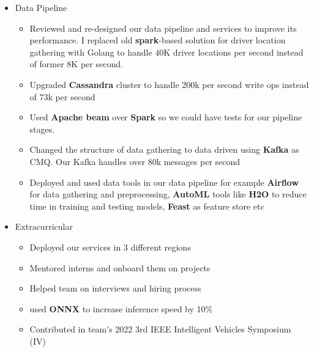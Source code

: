 \begin{itemize}
      \item Data Pipeline
            \begin{itemize}
                  \item Reviewed and re-designed our data pipeline and services to improve its performance.
                        I replaced old \textbf{spark}-based solution for driver location gathering with Golang to handle 40K driver
                        locations per second instead of former 8K per second.
                  \item Upgraded \textbf{Cassandra} cluster to handle 200k per second write ops instead of 73k per second
                  \item Used \textbf{Apache beam} over \textbf{Spark} so we could have tests for our pipeline stages.
                  \item Changed the structure of data gathering to data driven using \textbf{Kafka} as CMQ. Our Kafka handles over 80k messages per second
                  \item Deployed and used data tools in our data pipeline for example \textbf{Airflow} for data gathering and preprocessing, \textbf{AutoML} tools like \textbf{H2O} to reduce time in training and testing models, \textbf{Feast} as feature store etc
            \end{itemize}
      \item Extracurricular
            \begin{itemize}
                  \item Deployed our services in 3 different regions
                  \item Mentored interns and onboard them on projects
                  \item Helped team on interviews and hiring process
                  \item used \textbf{ONNX} to increase inference speed by 10\%
                  \item Contributed in team's 2022 3rd IEEE Intelligent Vehicles Symposium (IV)
            \end{itemize}
\end{itemize}

\vspace{0.5cm}

